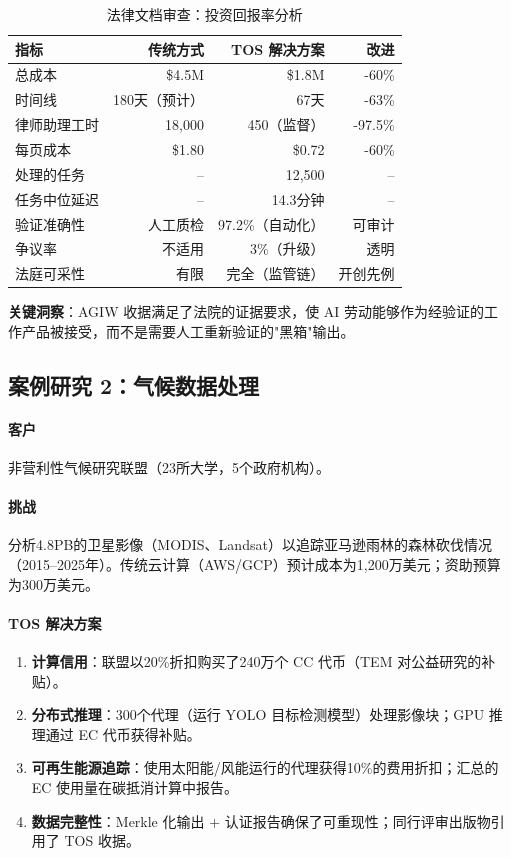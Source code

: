 \documentclass[11pt]{article}
\begin{document}
\begin{table}[H]
\centering
\caption{法律文档审查：投资回报率分析}
\label{tab:legal-roi}
\begin{tabular}{@{}lrrr@{}}
\toprule
\textbf{指标} & \textbf{传统方式} & \textbf{TOS 解决方案} & \textbf{改进} \\ \midrule
总成本 & \$4.5M & \$1.8M & -60\% \\
时间线 & 180天（预计） & 67天 & -63\% \\
律师助理工时 & 18,000 & 450（监督） & -97.5\% \\
每页成本 & \$1.80 & \$0.72 & -60\% \\
处理的任务 & -- & 12,500 & -- \\
任务中位延迟 & -- & 14.3分钟 & -- \\
验证准确性 & 人工质检 & 97.2\%（自动化） & 可审计 \\
争议率 & 不适用 & 3\%（升级） & 透明 \\
法庭可采性 & 有限 & 完全（监管链） & 开创先例 \\
\bottomrule
\end{tabular}
\end{table}

\textbf{关键洞察}：AGIW 收据满足了法院的证据要求，使 AI 劳动能够作为经验证的工作产品被接受，而不是需要人工重新验证的"黑箱"输出。

\subsection{案例研究 2：气候数据处理}

\paragraph{客户} 非营利性气候研究联盟（23所大学，5个政府机构）。

\paragraph{挑战} 分析4.8PB的卫星影像（MODIS、Landsat）以追踪亚马逊雨林的森林砍伐情况（2015--2025年）。传统云计算（AWS/GCP）预计成本为1,200万美元；资助预算为300万美元。

\paragraph{TOS 解决方案}
\begin{enumerate}[noitemsep]
  \item \textbf{计算信用}：联盟以20\%折扣购买了240万个 CC 代币（TEM 对公益研究的补贴）。
  \item \textbf{分布式推理}：300个代理（运行 YOLO 目标检测模型）处理影像块；GPU 推理通过 EC 代币获得补贴。
  \item \textbf{可再生能源追踪}：使用太阳能/风能运行的代理获得10\%的费用折扣；汇总的 EC 使用量在碳抵消计算中报告。
  \item \textbf{数据完整性}：Merkle 化输出 + 认证报告确保了可重现性；同行评审出版物引用了 TOS 收据。
\end{enumerate}
\end{document}
